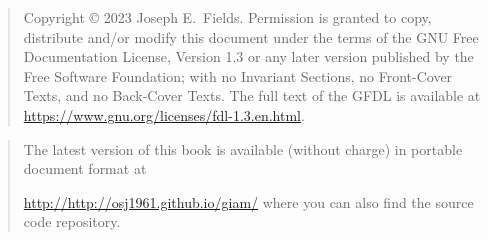 \rule{0pt}{0pt}

\vfill

\begin{quote}
    Copyright \copyright{}  2023  Joseph E.\ Fields.
    Permission is granted to copy, distribute and/or modify this document
    under the terms of the GNU Free Documentation License, Version 1.3
    or any later version published by the Free Software Foundation;
    with no Invariant Sections, no Front-Cover Texts, and no Back-Cover Texts.
    The full text of the GFDL is available at \url{https://www.gnu.org/licenses/fdl-1.3.en.html}.
\end{quote}

\vfill

\begin{quote}
The latest version of this book is available (without charge) in portable document format at 
\rule{0pt}{0pt} \hspace{1in} \url{http://http://osj1961.github.io/giam/} \newline
where you can also find the source code repository.


\end{quote}

\vfill

